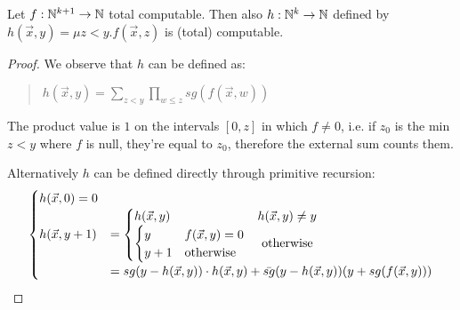 
\begin{lemma}
  Let $f: \mathbb{N}^{k+1} \rightarrow \mathbb{N}$ total computable. Then also
  $h: \mathbb{N}^{k} \rightarrow \mathbb{N}$ defined by
  $h(\vec{x},y) = \mu z<y. f(\vec{x},z)$ is (total) computable.
\end{lemma}

\begin{proof}
  We observe that $h$ can be defined as:
  
  \begin{quote}
    $h(\vec{x},y) = \sum_{z<y}\prod_{w\leq z} sg(f(\vec{x},w))$
  \end{quote}
  
  The product value is $1$ on the intervals $[0,z]$ in which $f\not= 0$,
  i.e. if $z_0$ is the min $z<y$ where $f$ is null, they're equal to
  $z_0$, therefore the external sum counts them.

  Alternatively $h$ can be defined directly through primitive recursion:
  \[
  \begin{cases}
    h(\vec{x},0) = 0 \\
      h (\vec{x},y+1)
      & =
        \begin{cases}
          h(\vec{x},y)               & h(\vec{x},y)\not= y \\
          \begin{cases}
            y   & f(\vec{x},y) = 0 \\
            y+1 & $otherwise$
          \end{cases} & $ otherwise $
        \end{cases}\\[2mm]
      & =sg(y-h(\vec{x},y)) \cdot h(\vec{x},y) + \bar{sg}(y-h(\vec{x},y))(y+sg(f(\vec{x},y)))
  \end{cases}
  \]
\end{proof}

